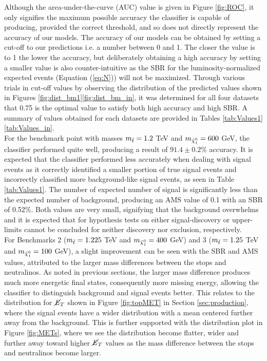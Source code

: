 Although the area-under-the-curve (AUC) value is given in Figure \ref{fig:ROC}, it only signifies the maximum possible accuracy the classifier is capable of producing, provided the correct threshold, and so does not directly represent the accuracy of our models. The accuracy of our models can be obtained by setting a cut-off to our predictions i.e. a number between 0 and 1. The closer the value is to 1 the lower the accuracy, but deliberately obtaining a high accuracy by setting a smaller value is also counter-intuitive as the SBR for the luminosity-normalized expected events (Equation (\ref{eq:N})) will not be maximized. Through various trials in cut-off values by observing the distribution of the predicted values shown in Figures \ref{fig:dist_bm1}\textemdash\ref{fig:dist_bm_in}, it was determined for all four datasets that 0.75 is the optimal value to satisfy both high accuracy and high SBR. A summary of values obtained for each datasets are provided in Tables \ref{tab:Values1}\textemdash\ref{tab:Values_in}. \\

For the benchmark point with masses $m_{\Tilde{t}} = 1.2$ TeV and $m_{\Tilde{\chi}_1^0} = 600$ GeV, the classifier performed quite well, producing a result of $91.4 \pm 0.2 \%$ accuracy. It is expected that the classifier performed less accurately when dealing with signal events as it correctly identified a smaller portion of true signal events and incorrectly classified more background-like signal events, as seen in Table \ref{tab:Values1}. The number of expected number of signal is significantly less than the expected number of background, producing an AMS value of 0.1 with an SBR of 0.52\%. Both values are very small, signifying that the background overwhelms and it is expected that for hypothesis tests on either signal-discovery or upper-limits cannot be concluded for neither discovery nor exclusion, respectively. \\

For Benchmarks 2 ($m_{\Tilde{t}} = 1.225$ TeV and $m_{\Tilde{\chi}_1^0} = 400$ GeV) and 3 ($m_{\Tilde{t}} = 1.25$ TeV and $m_{\Tilde{\chi}_1^0} = 100$ GeV), a slight improvement can be seen with the SBR and AMS values, attributed to the larger mass differences between the stops and neutralinos. As noted in previous sections, the larger mass difference produces much more energetic final states, consequently more missing energy, allowing the classifier to distinguish background and signal events better. This relates to the distribution for $\cancel{\it{E}}_{T}$ shown in Figure \ref{fig:topMET} in Section \ref{sec:production}, where the signal events have a wider distribution with a mean centered further away from the background. This is further supported with the distribution plot in Figure \ref{fig:METs}, where we see the distribution become flatter, wider and further away toward higher $\cancel{\it{E}}_{T}$ values as the mass difference between the stops and neutralinos become larger. \\

